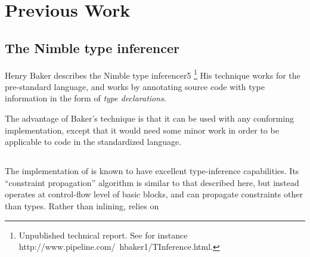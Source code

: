 \section{Previous Work}

\subsection{The Nimble type inferencer}

Henry Baker describes the Nimble type inferencer5
\footnote{Unpublished technical report.  See for instance
  http://www.pipeline.com/~hbaker1/TInference.html.}  His technique
works for the pre-standard \commonlisp{} language, and works by
annotating source code with type information in the form of
\emph{type declarations}.

The advantage of Baker's technique is that it can be used with any
conforming \commonlisp{} implementation, except that it would need some
minor work in order to be applicable to code in the standardized
language.

\subsection{\sbcl{}}

The \sbcl{} implementation of \commonlisp{} is known to have excellent
type-inference capabilities. Its ``constraint propagation'' algorithm
is similar to that described here, but instead operates at control-flow
level of basic blocks, and can propagate constraints other than types.
Rather than inlining, \sbcl{} relies on 
